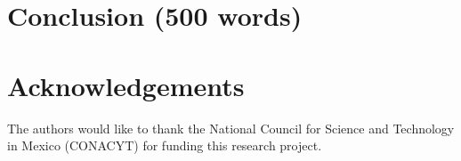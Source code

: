 \documentclass[pdftex,11pt,a4paper]{article}
\theoremstyle{definition}
\theoremstyle{remark}
\begin{document}
\section{Conclusion (500 words)}
\label{section_conclusion}
\blindtext

\section*{Acknowledgements}


The authors would like to thank the National Council for Science and Technology in Mexico (CONACYT) for funding this research project.




\end{document}
